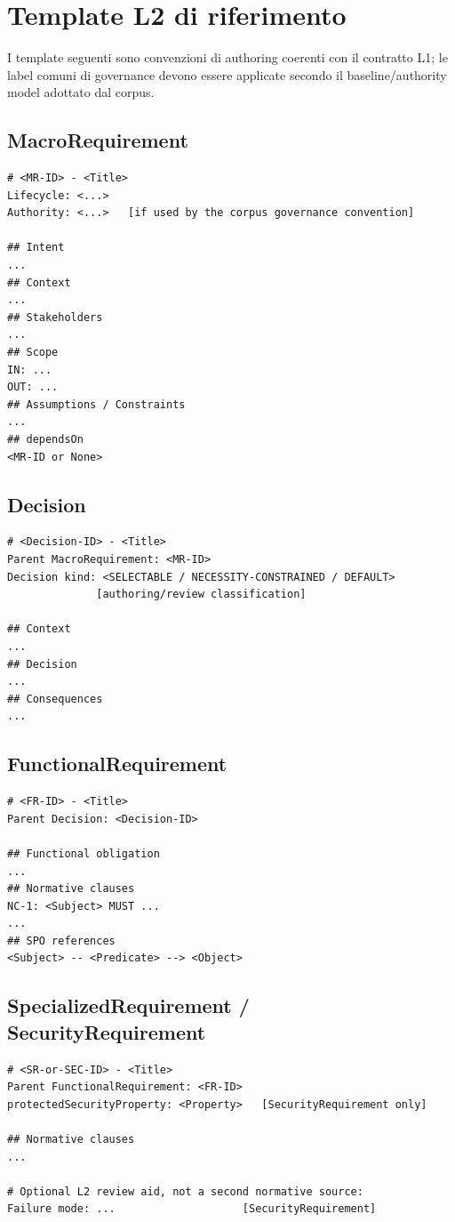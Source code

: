 \documentclass[11pt,a4paper]{article}
\begin{document}
\section{Template L2 di riferimento}

I template seguenti sono convenzioni di authoring coerenti con il contratto L1; le label comuni di governance devono essere applicate secondo il baseline/authority model adottato dal corpus.

\subsection{MacroRequirement}
\begin{lstlisting}
# <MR-ID> - <Title>
Lifecycle: <...>
Authority: <...>   [if used by the corpus governance convention]

## Intent
...
## Context
...
## Stakeholders
...
## Scope
IN: ...
OUT: ...
## Assumptions / Constraints
...
## dependsOn
<MR-ID or None>
\end{lstlisting}

\subsection{Decision}
\begin{lstlisting}
# <Decision-ID> - <Title>
Parent MacroRequirement: <MR-ID>
Decision kind: <SELECTABLE / NECESSITY-CONSTRAINED / DEFAULT>
              [authoring/review classification]

## Context
...
## Decision
...
## Consequences
...
\end{lstlisting}

\subsection{FunctionalRequirement}
\begin{lstlisting}
# <FR-ID> - <Title>
Parent Decision: <Decision-ID>

## Functional obligation
...
## Normative clauses
NC-1: <Subject> MUST ...
...
## SPO references
<Subject> -- <Predicate> --> <Object>
\end{lstlisting}

\subsection{SpecializedRequirement / SecurityRequirement}
\begin{lstlisting}
# <SR-or-SEC-ID> - <Title>
Parent FunctionalRequirement: <FR-ID>
protectedSecurityProperty: <Property>   [SecurityRequirement only]

## Normative clauses
...

# Optional L2 review aid, not a second normative source:
Failure mode: ...                    [SecurityRequirement]
\end{lstlisting}
\end{document}
